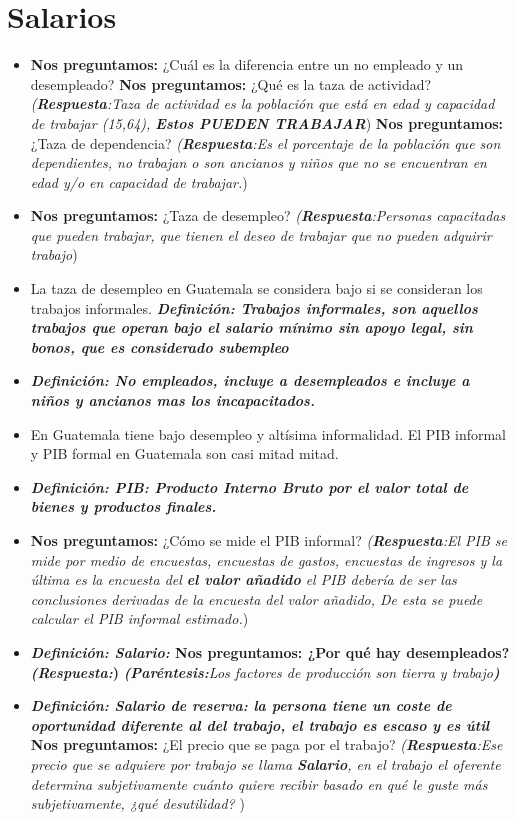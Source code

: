 \section{Salarios}
\begin{itemize}
    \item \textbf{Nos preguntamos:} ¿Cuál es la diferencia entre un no empleado y un desempleado? \textbf{Nos preguntamos:} ¿Qué es la taza de actividad? \emph{(\textbf{Respuesta}:Taza de actividad es la población que está en edad y capacidad de trabajar (15,64), \textbf{Estos PUEDEN TRABAJAR}}) \textbf{Nos preguntamos:} ¿Taza de dependencia? \emph{(\textbf{Respuesta}:Es el porcentaje de la población que son dependientes, no trabajan o son ancianos y niños que no se encuentran en edad y/o en capacidad de trabajar.})
    
    \item \textbf{Nos preguntamos:} ¿Taza de desempleo? \emph{(\textbf{Respuesta}:Personas capacitadas que pueden trabajar, que tienen el deseo de trabajar que no pueden adquirir trabajo})
    
    \item La taza de desempleo en Guatemala se considera bajo si se consideran los trabajos informales. \textbf{\emph{Definición: Trabajos informales, son aquellos trabajos que operan bajo el salario mínimo sin apoyo legal, sin bonos, que es considerado subempleo}}
    
    \item \textbf{\emph{Definición: No empleados, incluye a desempleados e incluye a niños y ancianos mas los incapacitados.}} 
    
    \item En Guatemala tiene bajo desempleo y altísima informalidad. El PIB informal y PIB formal en Guatemala son casi mitad mitad.
    
    \item \textbf{\emph{Definición: PIB: Producto Interno Bruto por el valor total de bienes y productos finales.}}
    
    \item \textbf{Nos preguntamos:} ¿Cómo se mide el PIB informal? \emph{(\textbf{Respuesta}:El PIB se mide por medio de encuestas, encuestas de gastos, encuestas de ingresos y la última es la encuesta del \textbf{el valor añadido} el PIB debería de ser las conclusiones derivadas de la encuesta del valor añadido, De esta se puede calcular el PIB informal estimado.})
    
    \item \textbf{\emph{Definición: Salario: }\textbf{Nos preguntamos:} ¿Por qué hay desempleados? \emph{(\textbf{Respuesta}:})} \emph{\textbf{(Paréntesis:}Los factores de producción son tierra y trabajo\textbf{)}} 
    \item \textbf{\emph{Definición: Salario de reserva: la persona tiene un coste de oportunidad diferente al del trabajo, el trabajo es escaso y es útil}} \textbf{Nos preguntamos:} ¿El precio que se paga por el trabajo? \emph{(\textbf{Respuesta}:Ese precio que se adquiere por trabajo se llama \textbf{Salario}, en el trabajo el oferente determina subjetivamente cuánto quiere recibir basado en qué le guste más subjetivamente, ¿qué desutilidad? })
    

\end{itemize}
